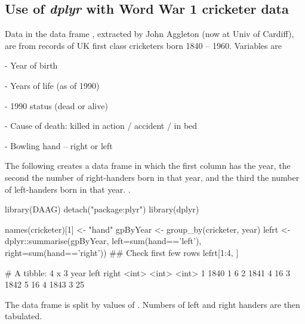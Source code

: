 \subsection{Use of {\em dplyr} with Word War 1 cricketer data}

Data in the data frame , extracted by John Aggleton
(now at Univ of Cardiff), are from records of UK first class
cricketers born 1840 -- 1960.  Variables are
\begin{list}{}{
\setlength{\itemsep}{1pt}
\setlength{\parsep}{1pt}}
\item[-] Year of birth
\item[-] Years of life (as of 1990)
\item[-] 1990 status (dead or alive)
\item[-] Cause of death: killed in action / accident / in bed
\item[-] Bowling hand -- right or left
\end{list}
The following creates a data frame in which the first column has the
year, the second the number of right-handers born in that year, and
the third the number of left-handers born in that year.
.
\begin{Schunk}
\begin{Sinput}
library(DAAG)
detach("package:plyr")
library(dplyr)
\end{Sinput}
\begin{Sinput}
names(cricketer)[1] <- "hand"
gpByYear <- group_by(cricketer, year)
lefrt <- dplyr::summarise(gpByYear,
                          left=sum(hand=='left'),
                          right=sum(hand=='right'))
## Check first few rows
lefrt[1:4, ]
\end{Sinput}
\begin{Soutput}
# A tibble: 4 x 3
   year  left right
  <int> <int> <int>
1  1840     1     6
2  1841     4    16
3  1842     5    16
4  1843     3    25
\end{Soutput}
\end{Schunk}
The data frame is split by values of .  Numbers of left
and right handers are then tabulated.

